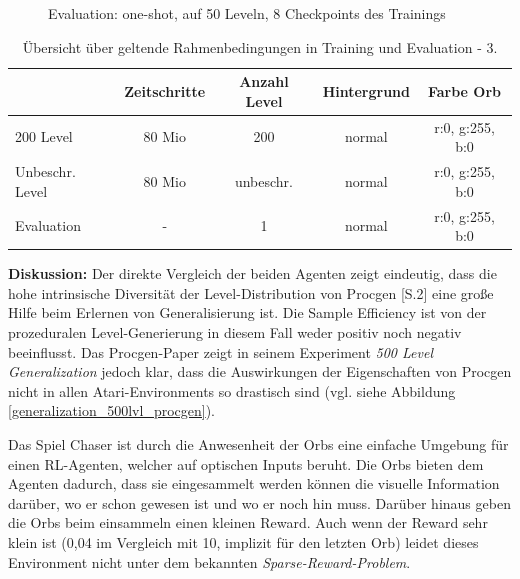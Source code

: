 \begin{figure}[htp!]
\begin{minipage}{0.48\linewidth}
        \caption{Evaluation: one-shot, auf 50 Leveln, 8 Checkpoints des Trainings}
        \label{fig:grph_floor_80Mio_inflvl_15act_evalAsTraining}
    \end{minipage}
\end{figure}

\begin{center}
 \begin{table}[htb!]
 \begin{center}
  \begin{tabular}{ l c c c c }
    \hline
		               & Zeitschritte & Anzahl Level & Hintergrund & Farbe Orb \\ \hline \hline
     200 Level           & 80 Mio       & 200		  & 	    normal & r:0, g:255, b:0 \\ \hline
     Unbeschr. Level & 80 Mio       & unbeschr.      & 	    normal & r:0, g:255, b:0 \\ \hline
     Evaluation 		& -	        	   & 1			  & 	    normal 	& r:0, g:255, b:0 \\ \hline
    \hline
  \end{tabular}
  \caption{Übersicht über geltende Rahmenbedingungen in Training und Evaluation - 3.}
  \label{tab:tab_durch_EXP_trainSetting3}
  \end{center}
 \end{table}
\end{center} 

\textbf{Diskussion:} Der direkte Vergleich der beiden Agenten zeigt eindeutig, dass die hohe intrinsische Diversität der Level-Distribution von Procgen \cite{cobbe2019procgen}[S.2] eine große Hilfe beim Erlernen von Generalisierung ist. Die Sample Efficiency ist von der prozeduralen Level-Generierung in diesem Fall weder positiv noch negativ beeinflusst. Das Procgen-Paper zeigt in seinem Experiment \emph{500 Level Generalization} jedoch klar, dass die Auswirkungen der Eigenschaften von Procgen nicht in allen Atari-Environments so drastisch sind (vgl. siehe Abbildung \ref{generalization_500lvl_procgen}). 

Das Spiel Chaser ist durch die Anwesenheit der Orbs eine einfache Umgebung für einen RL-Agenten, welcher auf optischen Inputs beruht. Die Orbs bieten dem Agenten dadurch, dass sie eingesammelt werden können die visuelle Information darüber, wo er schon gewesen ist und wo er noch hin muss. Darüber hinaus geben die Orbs beim einsammeln einen kleinen Reward. Auch wenn der Reward sehr klein ist (0,04 im Vergleich mit 10, implizit für den letzten Orb) leidet dieses Environment nicht unter dem bekannten \emph{Sparse-Reward-Problem}. 

